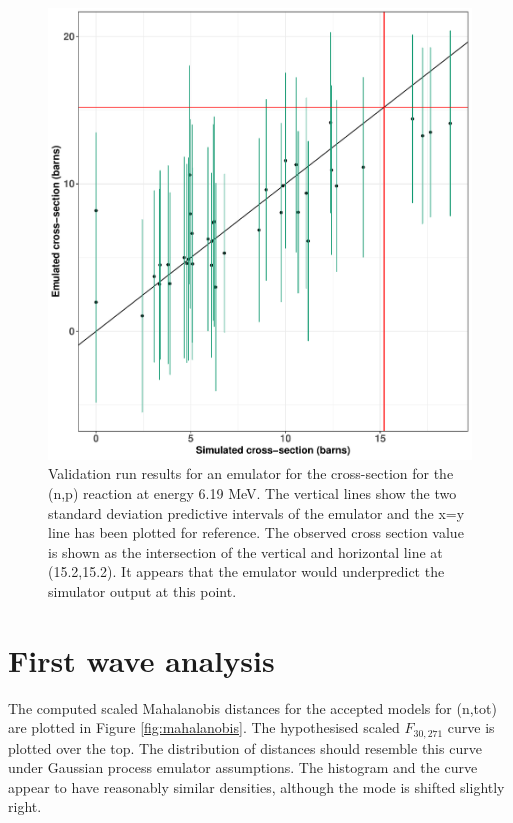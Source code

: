 \documentclass[
  12pt,
  a4paper,
  twoside]{book}
\begin{document}
\begin{figure}[H]

{\centering \includegraphics[width=0.8\linewidth]{figures/dodgynp6-19} 

}

\caption{Validation run results for an emulator for the cross-section for the (n,p) reaction at energy 6.19 MeV. The vertical lines show the two standard deviation predictive intervals of the emulator and the x=y line has been plotted for reference. The observed cross section value is shown as the intersection of the vertical and horizontal line at (15.2,15.2). It appears that the emulator would underpredict the simulator output at this point. }\label{fig:dodgy-emulator}
\end{figure}

\hypertarget{wave1-analysis}{%
\section{First wave analysis}\label{wave1-analysis}}

The computed scaled Mahalanobis distances for the accepted models for (n,tot) are plotted in Figure \ref{fig:mahalanobis}. The hypothesised scaled \(F_{30,271}\) curve is plotted over the top. The distribution of distances should resemble this curve under Gaussian process emulator assumptions. The histogram and the curve appear to have reasonably similar densities, although the mode is shifted slightly right.
\end{document}
